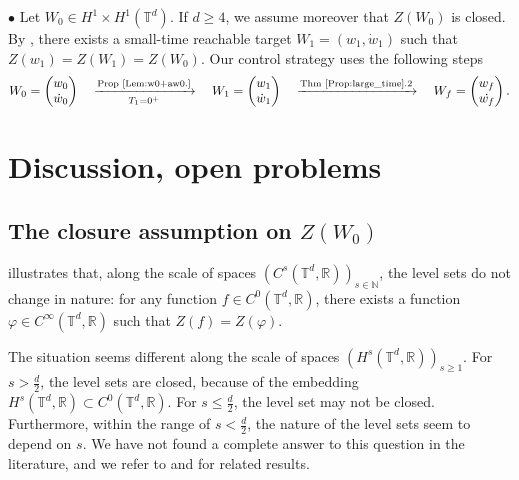 \documentclass[a4paper]{article}
\theoremstyle{plain}
\newcommand{\T}{\mathbb{T}}
\newcommand{\R}{\mathbb{R}}
\begin{document}
\bigskip

\noindent $\bullet$ Let $W_0 \in H^1 \times H^1(\T^d)$. If $d \geq 4$, we assume moreover that $Z(W_0)$ is closed. By , there exists a small-time reachable target $W_1=(w_1,\dot{w}_1)$ such that $Z(w_1)=Z(W_1)=Z(W_0)$. Our control strategy uses the following steps
$$W_0=\begin{pmatrix}
    w_0 \\ \dot{w}_0
\end{pmatrix}
\quad \xrightarrow[T_1=0^+]{\text{Prop \ref{Lem:w0+aw0.}}} \quad
W_1=\begin{pmatrix}
    w_1 \\ \dot{w}_1
\end{pmatrix}
\quad \xrightarrow[]{\text{Thm \ref{Prop:large_time}.2}} \quad
W_f=\begin{pmatrix}
    w_f \\ \dot{w_f}
\end{pmatrix}.$$







\section{Discussion, open problems}
\label{sec:Discussion}


\subsection{The closure assumption on $Z(W_0)$}
\label{subsec:Z(W0)close}

 illustrates that,
along the scale of spaces $(C^s(\T^d,\R))_{s\in\mathbb{N}}$, the level sets do not change in nature: for any function $f \in C^0(\T^d,\R)$, there exists a function $\varphi \in C^{\infty}(\T^d,\R)$ such that $Z(f)=Z(\varphi)$.

The situation seems different along the scale of spaces $(H^s(\T^d,\R))_{s\geq 1}$. For $s>\frac{d}{2}$, the level sets are closed, because of the embedding $H^s(\T^d,\R) \subset C^0(\T^d,\R)$. For $s\leq \frac{d}{2}$, the level set may not be closed. Furthermore, within the range of $s<\frac{d}{2}$, the nature of the level sets seem to depend on $s$. We have not found a complete answer to this question in the literature, and we refer to \cite[Section 4.7 and 4.8]{EvansGariepy} and \cite{Schikorra} for related results.
\end{document}
